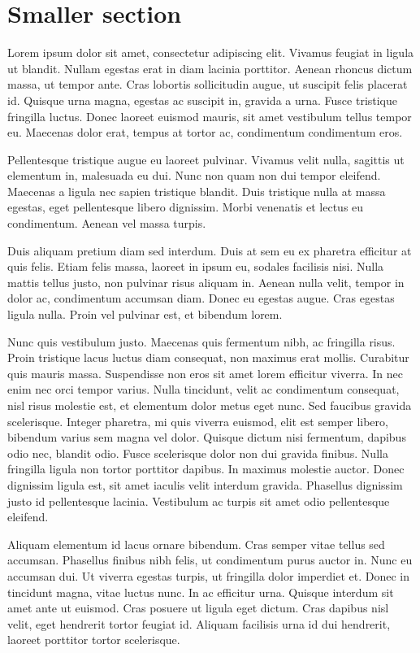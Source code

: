 \documentclass[11pt]{article}
\begin{document}
    \section{Smaller section}
    Lorem ipsum dolor sit amet, consectetur adipiscing elit. Vivamus feugiat in ligula ut blandit. Nullam egestas erat in diam lacinia porttitor. Aenean rhoncus dictum massa, ut tempor ante. Cras lobortis sollicitudin augue, ut suscipit felis placerat id. Quisque urna magna, egestas ac suscipit in, gravida a urna. Fusce tristique fringilla luctus. Donec laoreet euismod mauris, sit amet vestibulum tellus tempor eu. Maecenas dolor erat, tempus at tortor ac, condimentum condimentum eros.

    Pellentesque tristique augue eu laoreet pulvinar. Vivamus velit nulla, sagittis ut elementum in, malesuada eu dui. Nunc non quam non dui tempor eleifend. Maecenas a ligula nec sapien tristique blandit. Duis tristique nulla at massa egestas, eget pellentesque libero dignissim. Morbi venenatis et lectus eu condimentum. Aenean vel massa turpis.

    Duis aliquam pretium diam sed interdum. Duis at sem eu ex pharetra efficitur at quis felis. Etiam felis massa, laoreet in ipsum eu, sodales facilisis nisi. Nulla mattis tellus justo, non pulvinar risus aliquam in. Aenean nulla velit, tempor in dolor ac, condimentum accumsan diam. Donec eu egestas augue. Cras egestas ligula nulla. Proin vel pulvinar est, et bibendum lorem.

    Nunc quis vestibulum justo. Maecenas quis fermentum nibh, ac fringilla risus. Proin tristique lacus luctus diam consequat, non maximus erat mollis. Curabitur quis mauris massa. Suspendisse non eros sit amet lorem efficitur viverra. In nec enim nec orci tempor varius. Nulla tincidunt, velit ac condimentum consequat, nisl risus molestie est, et elementum dolor metus eget nunc. Sed faucibus gravida scelerisque. Integer pharetra, mi quis viverra euismod, elit est semper libero, bibendum varius sem magna vel dolor. Quisque dictum nisi fermentum, dapibus odio nec, blandit odio. Fusce scelerisque dolor non dui gravida finibus. Nulla fringilla ligula non tortor porttitor dapibus. In maximus molestie auctor. Donec dignissim ligula est, sit amet iaculis velit interdum gravida. Phasellus dignissim justo id pellentesque lacinia. Vestibulum ac turpis sit amet odio pellentesque eleifend.

    Aliquam elementum id lacus ornare bibendum. Cras semper vitae tellus sed accumsan. Phasellus finibus nibh felis, ut condimentum purus auctor in. Nunc eu accumsan dui. Ut viverra egestas turpis, ut fringilla dolor imperdiet et. Donec in tincidunt magna, vitae luctus nunc. In ac efficitur urna. Quisque interdum sit amet ante ut euismod. Cras posuere ut ligula eget dictum. Cras dapibus nisl velit, eget hendrerit tortor feugiat id. Aliquam facilisis urna id dui hendrerit, laoreet porttitor tortor scelerisque.
\end{document}
